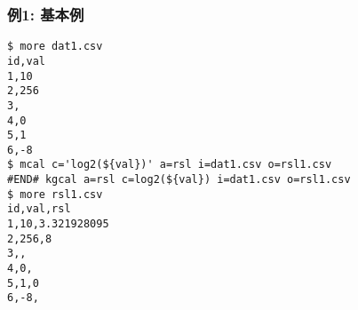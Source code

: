 \subsubsection*{例1: 基本例}



\begin{Verbatim}[baselinestretch=0.7,frame=single]
$ more dat1.csv
id,val
1,10
2,256
3,
4,0
5,1
6,-8
$ mcal c='log2(${val})' a=rsl i=dat1.csv o=rsl1.csv
#END# kgcal a=rsl c=log2(${val}) i=dat1.csv o=rsl1.csv
$ more rsl1.csv
id,val,rsl
1,10,3.321928095
2,256,8
3,,
4,0,
5,1,0
6,-8,
\end{Verbatim}
